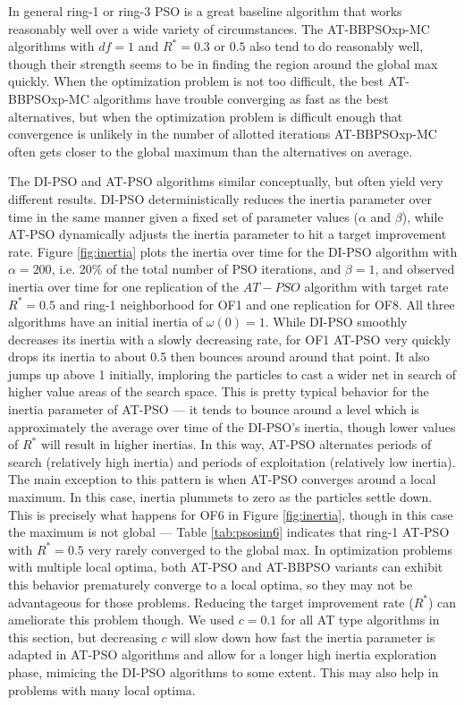 \documentclass[12pt]{article}
\begin{document}
\begin{appendix}
In general ring-1 or ring-3 PSO is a great baseline algorithm that works reasonably well over a wide variety of circumstances. The AT-BBPSOxp-MC algorithms with $df=1$ and $R^*=0.3$ or $0.5$ also tend to do reasonably well, though their strength seems to be in finding the region around the global max quickly. When the optimization problem is not too difficult, the best AT-BBPSOxp-MC algorithms have trouble converging as fast as the best alternatives, but when the optimization problem is difficult enough that convergence is unlikely in the number of allotted iterations AT-BBPSOxp-MC often gets closer to the global maximum than the alternatives on average.

The DI-PSO and AT-PSO algorithms similar conceptually, but often yield very different results. DI-PSO deterministically reduces the inertia parameter over time in the same manner given a fixed set of parameter values ($\alpha$ and $\beta$), while AT-PSO dynamically adjusts the inertia parameter to hit a target improvement rate. Figure \ref{fig:inertia} plots the inertia over time for the DI-PSO algorithm with $\alpha=200$, i.e. 20\% of the total number of PSO iterations, and $\beta=1$, and observed inertia over time for one replication of the $AT-PSO$ algorithm with target rate $R^*=0.5$ and ring-1 neighborhood for OF1 and one replication for OF8. All three algorithms have an initial inertia of $\omega(0)=1$. While DI-PSO smoothly decreases its inertia with a slowly decreasing rate, for OF1 AT-PSO very quickly drops its inertia to about 0.5 then bounces around around that point. It also jumps up above 1 initially, imploring the particles to cast a wider net in search of higher value areas of the search space. This is pretty typical behavior for the inertia parameter of AT-PSO --- it tends to bounce around a level which is approximately the average over time of the DI-PSO's inertia, though lower values of $R^*$ will result in higher inertias. In this way, AT-PSO alternates periods of search (relatively high inertia) and periods of exploitation (relatively low inertia). The main exception to this pattern is when AT-PSO converges around a local maximum. In this case, inertia plummets to zero as the particles settle down. This is precisely what happens for OF6 in Figure \ref{fig:inertia}, though in this case the maximum is not global --- Table \ref{tab:psosim6} indicates that ring-1 AT-PSO with $R^*=0.5$ very rarely converged to the global max. In optimization problems with multiple local optima, both AT-PSO and AT-BBPSO variants can exhibit this behavior prematurely converge to a local optima, so they may not be advantageous for those problems. Reducing the target improvement rate ($R^*$) can ameliorate this problem though. We used $c=0.1$ for all AT type algorithms in this section, but decreasing $c$ will slow down how fast the inertia parameter is adapted in AT-PSO algorithms and allow for a longer high inertia exploration phase, mimicing the DI-PSO algorithms to some extent. This may also help in problems with many local optima.


\end{appendix}
\end{document}
